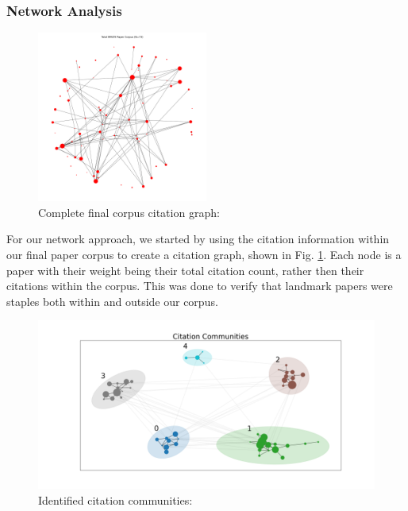 \documentclass[manuscript,screen,review]{acmart}
\begin{document}
\subsubsection{Network Analysis}


\begin{figure}
    \centering
    \includegraphics[width=0.5\textwidth, trim=1cm 1cm 1cm 2cm, clip]{img/community_analysis/mmlte_total_corpus_graph.png}
    \caption{Complete final corpus citation graph: }
    \label{fig:final_corpus_citation_graph}
\end{figure}

For our network approach, we started by using the citation information within our final paper corpus to create a citation graph, shown in Fig. \ref{fig:final_corpus_citation_graph}. Each node is a paper with their weight being their total citation count, rather then their citations within the corpus. This was done to verify that landmark papers were staples both within and outside our corpus.  


\begin{figure}
    \centering
    \includegraphics[width=\textwidth, trim=3cm 2cm 3cm 2cm, clip]{img/community_analysis/community_network.png}
    \caption{Identified citation communities: }
    \label{fig:citation_communities}
\end{figure}
\end{document}
